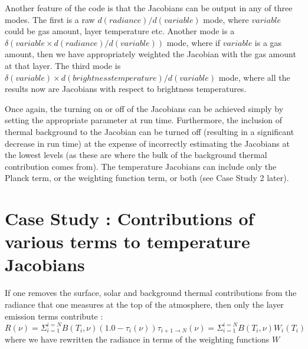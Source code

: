 \documentclass[11pt]{article}
\begin{document}
Another feature of the code is that the Jacobians can be output in any
of three modes. The first is a raw $d(radiance)/d(variable)$ mode,
where $variable$ could be gas amount, layer temperature etc. Another
mode is a $\delta(variable \times d(radiance)/d(variable))$ mode, where if
$variable$ is a gas amount, then we have appropriately weighted the
Jacobian with the gas amount at that layer. The third mode is 
$\delta(variable) \times d(brightness temperature)/d(variable)$ mode, where
all the results now are Jacobians with respect to brightness
temperatures.

Once again, the turning on or off of the Jacobians can be achieved
simply by setting the appropriate parameter at run time. Furthermore,
the inclusion of thermal background to the Jacobian can be turned off
(resulting in a significant decrease in run time) at the expense of
incorrectly estimating the Jacobians at the lowest levels (as these
are where the bulk of the background thermal contribution comes from).
The temperature Jacobians can include only the Planck term, or the weighting
function term, or both (see Case Study 2 later). 

\section{Case Study : Contributions of various terms to temperature 
Jacobians}

If one removes the surface, solar and background thermal contributions
from the radiance that one measures at the top of the atmosphere, then
only the layer emission terms contribute :
\begin{equation}
R(\nu) = \Sigma_{i=1}^{i=N} B(T_{i},\nu) (1.0 - \tau_{i}(\nu)) 
\tau_{i+1\rightarrow N}(\nu) = \Sigma_{i=1}^{i=N} B(T_{i},\nu) W_{i}(T_{i})
\end{equation}
where we have rewritten the radiance in terms of the weighting functions $W$
\end{document}
